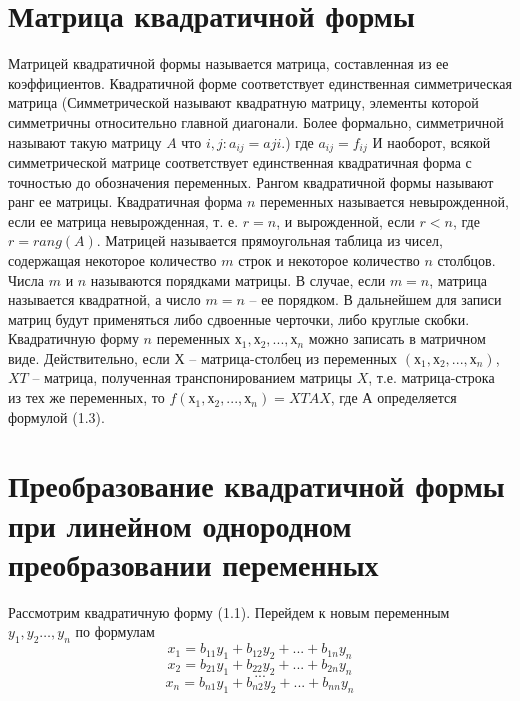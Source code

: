 \documentclass[a4paper,14pt]{report}
\newcommand\tab[1][1cm]{\hspace*{#1}}
\newcommand{\tl}{\newline\tab}
\begin{document}
\section{Матрица квадратичной формы}
\tab Матрицей квадратичной формы называется матрица, составленная из ее коэффициентов. Квадратичной форме соответствует единственная симметрическая матрица (Симметрической называют квадратную матрицу, элементы которой симметричны относительно главной диагонали. Более формально, симметричной называют такую матрицу $A$ что $i,j:a_{ij}=a{ji}$.)
где $a_{ij}=f_{ij}$
\tl
И наоборот, всякой симметрической матрице соответствует единственная квадратичная форма с точностью до обозначения переменных.
\tab
Рангом квадратичной формы называют ранг ее матрицы. Квадратичная форма $n$ переменных называется невырожденной, если ее матрица невырожденная, т. е. $r = n$, и вырожденной, если $r < n$, где $r=rang(A)$. 
\tl
Матрицей называется прямоугольная таблица из чисел, содержащая некоторое количество $m$ строк и некоторое количество $n$ столбцов. Числа $m$ и $n$ называются порядками матрицы. В случае, если $m = n$, матрица называется квадратной, а число $m= n$ – ее порядком.
\tl
В дальнейшем для записи матриц будут применяться либо сдвоенные черточки, либо круглые скобки.
\tl
Квадратичную форму $n$ переменных $х_1, х_2,...,х_n$ можно записать в матричном виде. Действительно, если $Х$ – матрица-столбец из переменных $(х_1, х_2,...,х_n)$, $XT$ – матрица, полученная транспонированием матрицы $X$, т.е. матрица-строка из тех же переменных, то $f(х_1, х_2,...,х_n)= XTAX$, где $А$ определяется формулой (1.3).

\section{Преобразование квадратичной формы при линейном однородном преобразовании переменных}
\tab Рассмотрим квадратичную форму (1.1). Перейдем к новым переменным $y_1, y_2…,y_n$ по формулам 
$$x_1=b_{11}y_1+b_{12}y_2+...+b_{1n}y_n$$
$$x_2=b_{21}y_1+b_{22}y_2+...+b_{2n}y_n$$
$$...$$
$$x_n=b_{n1}y_1+b_{n2}y_2+...+b_{nn}y_n$$
\end{document}
